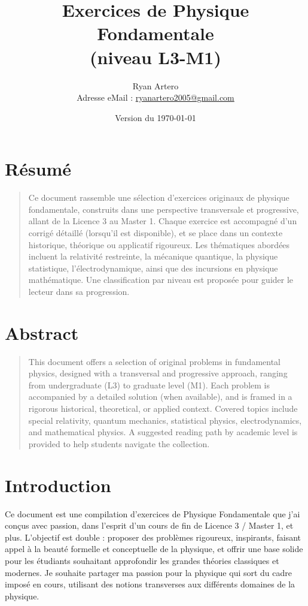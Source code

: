 \documentclass[a4paper,10pt]{report}
\title{Exercices de Physique Fondamentale \\ \small (niveau L3-M1)}
\author{Ryan Artero \\Adresse eMail : \href{mailto:ryanartero2005@gmail.com}{ryanartero2005@gmail.com}}
\date{Version du \today}
\begin{document}
	\maketitle
	 \newpage
	\tableofcontents
	\newpage
	\chapter*{Résumé}
	\vspace{-1em}
	\begin{quotation}
	Ce document rassemble une sélection d'exercices originaux de physique fondamentale, construits dans une perspective transversale et progressive, allant de la Licence 3 au Master 1. Chaque exercice est accompagné d’un corrigé détaillé (lorsqu’il est disponible), et se place dans un contexte historique, théorique ou applicatif rigoureux. Les thématiques abordées incluent la relativité restreinte, la mécanique quantique, la physique statistique, l'électrodynamique, ainsi que des incursions en physique mathématique. Une classification par niveau est proposée pour guider le lecteur dans sa progression.
	\end{quotation}
	
	\chapter*{Abstract}
	\vspace{-1em}
	\begin{quotation}
	This document offers a selection of original problems in fundamental physics, designed with a transversal and progressive approach, ranging from undergraduate (L3) to graduate level (M1). Each problem is accompanied by a detailed solution (when available), and is framed in a rigorous historical, theoretical, or applied context. Covered topics include special relativity, quantum mechanics, statistical physics, electrodynamics, and mathematical physics. A suggested reading path by academic level is provided to help students navigate the collection.
	\end{quotation}
	
	\chapter{Introduction}
	Ce document est une compilation d'exercices de Physique Fondamentale que j’ai conçus avec passion, dans l’esprit d’un cours de fin de Licence 3 / Master 1, et plus. L’objectif est double : proposer des problèmes rigoureux, inspirants, faisant appel à la beauté formelle et conceptuelle de la physique, et offrir une base solide pour les étudiants souhaitant approfondir les grandes théories classiques et modernes. Je souhaite partager ma passion pour la physique qui sort du cadre imposé en cours, utilisant des notions transverses aux différents domaines de la physique.
	
\end{document}
